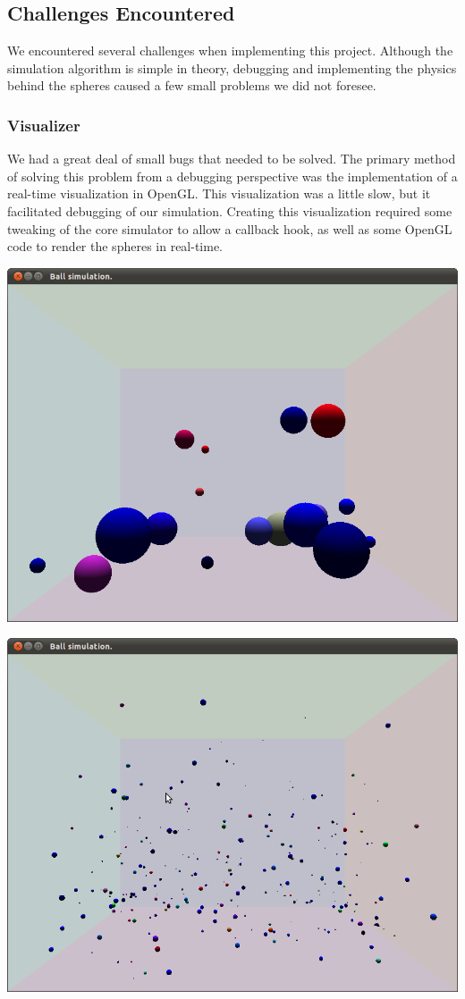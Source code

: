 \documentclass[conference]{IEEEtran}
\begin{document}
\subsection{Challenges Encountered}
We encountered several challenges when implementing this project.  Although the simulation algorithm is simple in theory, debugging and implementing the physics behind the spheres caused a few small problems we did not foresee.

\subsubsection{Visualizer}
We had a great deal of small bugs that needed to be solved.  The primary method of solving this problem from a debugging perspective was the implementation of a real-time visualization in OpenGL.
This visualization was a little slow, but it facilitated debugging of our simulation.  Creating this visualization required some tweaking of the core simulator to allow a callback hook, as well as some OpenGL code to render the spheres in real-time.

\begin{center}
	\includegraphics[width=.45\textwidth]{few.png}
	\label{fig:few}
\end{center}

\begin{center}
	\includegraphics[width=.45\textwidth]{lots.png}
	\label{fig:lots}
\end{center}
\end{document}
